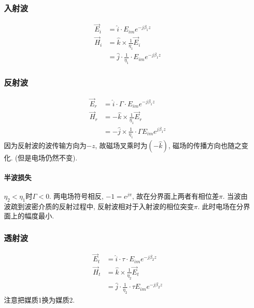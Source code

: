 \documentclass[a4paper]{report}
\begin{document}
\subsubsection{入射波}
\begin{align*}
    \vec{E}_i&=\hat{i}\cdot E_{im} e^{-j\beta_1 z} \\
    \vec{H}_i&=\hat{k}\times \frac{1}{\eta_1}\vec{E}_i\\
    &=\hat{j}\cdot \frac{1}{\eta_1}\cdot E_{im} e^{-j\beta_1 z} 
\end{align*}
\subsubsection{反射波}
\begin{align*}
    \vec{E}_r&=\hat{i}\cdot \Gamma \cdot E_{im}  e^{-j\beta_1 z}\\
    \vec{H}_r&=-\hat{k}\times \frac{1}{\eta_1} \vec{E}_r\\
    &=-\hat{j}\times \frac{1}{\eta_1}\cdot \Gamma E_{im} e^{j\beta_1 z}
\end{align*}
因为反射波的波传输方向为$-z$, 故磁场叉乘时为$(-\hat{k})$, 磁场的传播方向也随之变化. (但是电场仍然不变). 
\paragraph{半波损失} $\eta_2<\eta_1$时$\Gamma<0$. 两电场符号相反, $-1=e^{j\pi}$, 故在分界面上两者有相位差$\pi$. 当波由波疏到波密介质的反射过程中, 反射波相对于入射波的相位突变$\pi$. 此时电场在分界面上的幅度最小. 
\subsubsection{透射波}
\begin{align*}
    \vec{E}_t&=\hat{i}\cdot \tau \cdot E_{im} e^{-j\beta_2 z}\\
    \vec{H}_t&=\hat{k}\times \frac{1}{\eta_2}\vec{E}_t\\
    &=  \hat{j}\cdot \frac{1}{\eta_2}\cdot \tau E_{im} e^{-j\beta_2 z}
\end{align*}
注意把媒质1换为媒质2. 
\end{document}
